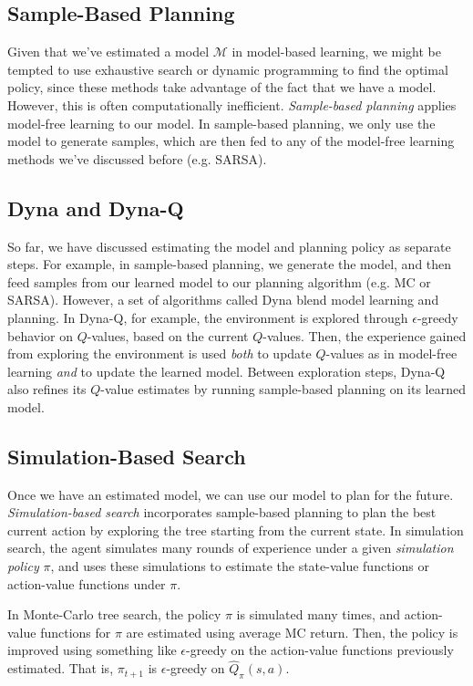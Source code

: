 \documentclass{article}
\newcommand{\ita}{\textit}
\newcommand{\eps}{\epsilon}
\begin{document}
\subsection{Sample-Based Planning}

Given that we've estimated a model $\mathcal{M}$ in model-based learning, we might be tempted to use exhaustive search or dynamic programming to find the optimal policy, since these methods take advantage of the fact that we have a model. However, this is often computationally inefficient. \ita{Sample-based planning} applies model-free learning to our model. In sample-based planning, we only use the model to generate samples, which are then fed to any of the model-free learning methods we've discussed before (e.g. SARSA).

\subsection{Dyna and Dyna-Q}

So far, we have discussed estimating the model and planning policy as separate steps. For example, in sample-based planning, we generate the model, and then feed samples from our learned model to our planning algorithm (e.g. MC or SARSA). However, a set of algorithms called Dyna blend model learning and planning. In Dyna-Q, for example, the environment is explored through $\eps$-greedy behavior on $Q$-values, based on the current $Q$-values. Then, the experience gained from exploring the environment is used \ita{both} to update $Q$-values as in model-free learning \ita{and} to update the learned model. Between exploration steps, Dyna-Q also refines its $Q$-value estimates by running sample-based planning on its learned model.

\subsection{Simulation-Based Search}

Once we have an estimated model, we can use our model to plan for the future. \ita{Simulation-based search} incorporates sample-based planning to plan the best current action by exploring the tree starting from the current state. In simulation search, the agent simulates many rounds of experience under a given \ita{simulation policy} $\pi$, and uses these simulations to estimate the state-value functions or action-value functions under $\pi$.

In Monte-Carlo tree search, the policy $\pi$ is simulated many times, and action-value functions for $\pi$ are estimated using average MC return. Then, the policy is improved using something like $\eps$-greedy on the action-value functions previously estimated. That is, $\pi_{t+1}$ is $\eps$-greedy on $\hat{Q}_\pi(s, a)$.
\end{document}

